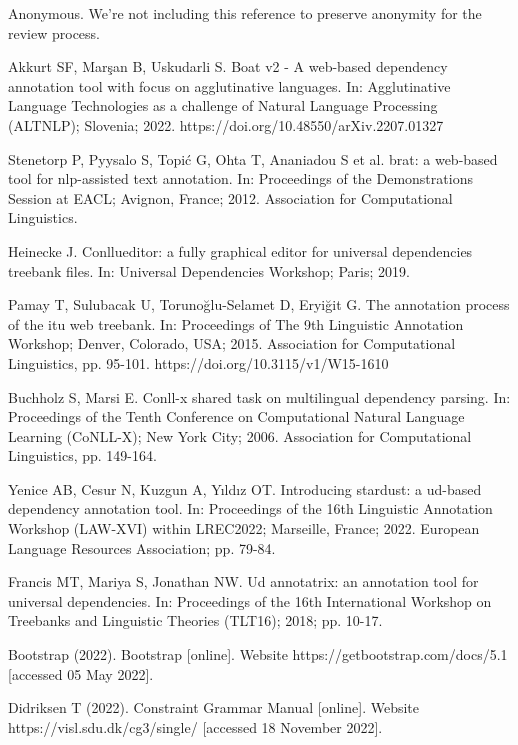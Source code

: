 
\begin{thebibliography}{99}

 Anonymous. We're not including this reference to preserve anonymity for the review process.

 Akkurt SF, Marşan B, Uskudarli S. Boat v2 - A web-based dependency annotation tool with focus on agglutinative languages. In: Agglutinative Language Technologies as a challenge of Natural Language Processing (ALTNLP); Slovenia; 2022. https://doi.org/10.48550/arXiv.2207.01327

 Stenetorp P, Pyysalo S, Topi\'{c} G, Ohta T, Ananiadou S et al. brat: a web-based tool for nlp-assisted text annotation. In: Proceedings of the Demonstrations Session at EACL; Avignon, France; 2012. Association for Computational Linguistics.

 Heinecke J. Conllueditor: a fully graphical editor for universal dependencies treebank files. In: Universal Dependencies Workshop; Paris; 2019.

 Pamay T, Sulubacak U, Toruno{\u{g}}lu-Selamet D, Eryi{\u{g}}it G. The annotation process of the itu web treebank. In: Proceedings of The 9th Linguistic Annotation Workshop; Denver, Colorado, USA; 2015. Association for Computational Linguistics, pp. 95-101. https://doi.org/10.3115/v1/W15-1610

 Buchholz S, Marsi E. Conll-x shared task on multilingual dependency parsing. In: Proceedings of the Tenth Conference on Computational Natural Language Learning (CoNLL-X); New York City; 2006. Association for Computational Linguistics, pp. 149-164.

 Yenice AB, Cesur N, Kuzgun A, Y{\i}ld{\i}z OT. Introducing stardust: a ud-based dependency annotation tool. In: Proceedings of the 16th Linguistic Annotation Workshop (LAW-XVI) within LREC2022; Marseille, France; 2022. European Language Resources Association; pp. 79-84.

 Francis MT, Mariya S, Jonathan NW. Ud annotatrix: an annotation tool for universal dependencies. In: Proceedings of the 16th International Workshop on Treebanks and Linguistic Theories (TLT16); 2018; pp. 10-17.

 Bootstrap (2022). Bootstrap [online]. Website https://getbootstrap.com/docs/5.1 [accessed 05 May 2022].

 Didriksen T (2022). Constraint Grammar Manual [online]. Website https://visl.sdu.dk/cg3/single/ [accessed 18 November 2022].


\end{thebibliography}

